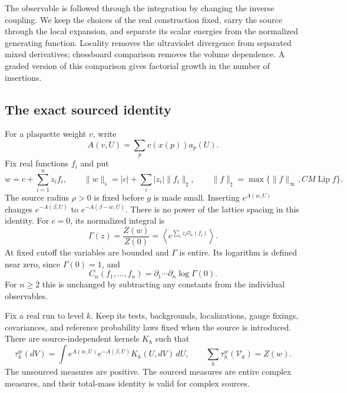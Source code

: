\documentclass[11pt,letterpaper,reqno]{amsart}
\makeatletter
\theoremstyle{definition}
\newcommand{\ms@minorstart}{%
  \pushQED{\qed}\renewcommand{\qedsymbol}{$\blacksquare$}}
\newenvironment{proposition}[1][]{\ms@minorstart\ms@proposition[#1]}
  {\popQED\endms@proposition}
\theoremstyle{remark}
\newcommand{\cO}{\mathcal O}
\newcommand{\Lip}{\operatorname{Lip}}
\makeatother
\begin{document}
The observable is followed through the integration by changing the
inverse coupling. We keep the choices of the real construction fixed,
carry the source through the local expansion, and separate its scalar
energies from the normalized generating function. Locality removes the
ultraviolet divergence from separated mixed derivatives; chessboard
comparison removes the volume dependence. A graded version of this
comparison gives factorial growth in the number of insertions.

\subsection{The exact sourced identity}

For a plaquette weight $v$, write
\[
 A(v,U)=\sum_pv(x(p))a_p(U).
\]
Fix real functions $f_i$ and put
\[
 w=c+\sum_{i=1}^nz_if_i,
 \qquad \|w\|_\flat=|c|+\sum_i|z_i|\|f_i\|_\sharp,
 \qquad \|f\|_\sharp=\max\{\|f\|_\infty,CM\Lip f\}.
\]
The source radius $\rho>0$ is fixed before $g$ is made small.
Inserting $e^{A(w,U)}$ changes $e^{-A(\beta,U)}$ to
$e^{-A(\beta-w,U)}$. There is no power of the lattice spacing in this
identity. For $c=0$, its normalized integral is
\[
 \Gamma(z)=\frac{Z(w)}{Z(0)}
    =\left\langle e^{\sum_i z_i\cO_a(f_i)}\right\rangle.
\]
At fixed cutoff the variables are bounded and $\Gamma$ is entire. Its
logarithm is defined near zero, since $\Gamma(0)=1$, and
\[
 C_n(f_1,\ldots,f_n)=\partial_1\cdots\partial_n\log\Gamma(0).
\]
For $n\ge2$ this is unchanged by subtracting any constants from the
individual observables.

\begin{proposition}[Frozen source transport]\label{prop:frozen-source-transport}
Fix a real run to level $k$. Keep its tests, backgrounds, localizations,
gauge fixings, covariances, and reference probability laws fixed when
the source is introduced. There are source-independent kernels $K_h$
such that
\[
 \tau_h^w(dV)=\int e^{A(w,U)}e^{-A(\beta,U)}K_h(U,dV)\,dU,
 \qquad \sum_h\tau_h^w(\mathcal V_k)=Z(w).
\]
The unsourced measures are positive. The sourced measures are entire
complex measures, and their total-mass identity is valid for complex
sources.
\end{proposition}
\end{document}
